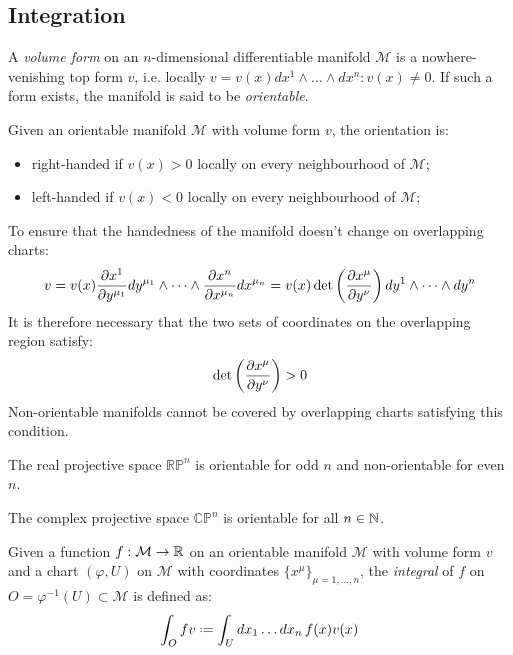 \subsection{Integration}

\begin{definition}
  A \textit{volume form} on an $ n $-dimensional differentiable manifold $ \mathcal{M} $ is a nowhere-venishing top form $ v $, i.e. locally $ v = v(x) dx^1 \wedge \dots \wedge dx^n : v(x) \neq 0 $. If such a form exists, the manifold is said to be \textit{orientable}.
\end{definition}

\begin{definition}
  Given an orientable manifold $ \mathcal{M} $ with volume form $ v $, the orientation is:
  \begin{itemize}
    \item right-handed if $ v(x) > 0 $ locally on every neighbourhood of $ \mathcal{M} $;
    \item left-handed if $ v(x) < 0 $ locally on every neighbourhood of $ \mathcal{M} $;
  \end{itemize}
\end{definition}

To ensure that the handedness of the manifold doesn't change on overlapping charts:
\begin{equation*}
  v = v(x) \frac{\partial x^1}{\partial y^{\mu_1}} dy^{\mu_1} \wedge \dots \wedge \frac{\partial x^n}{\partial x^{\mu_n}} dx^{\mu_n} = v(x) \det \left( \frac{\partial x^{\mu}}{\partial y^{\nu}} \right) dy^1 \wedge \dots \wedge dy^n
\end{equation*}
It is therefore necessary that the two sets of coordinates on the overlapping region satisfy:
\begin{equation}
  \det \left( \frac{\partial x^{\mu}}{\partial y^{\nu}} \right) > 0
  \label{eq:2.45}
\end{equation}
Non-orientable manifolds cannot be covered by overlapping charts satisfying this condition.

\begin{example}
  The real projective space $ \mathbb{RP}^n $ is orientable for odd $ n $ and non-orientable for even $ n $.
\end{example}
\begin{example}
  The complex projective space $ \mathbb{CP}^n $ is orientable for all $ n \in \mathbb{N} $.
\end{example}

\begin{definition}
  Given a function $ f : \mathcal{M} \rightarrow \mathbb{R} $ on an orientable manifold $ \mathcal{M} $ with volume form $ v $ and a chart $ (\varphi,U) $ on $ \mathcal{M} $ with coordinates $ \{x^{\mu}\}_{\mu = 1,\dots,n} $, the \textit{integral} of $ f $ on $ O = \varphi^{-1}(U) \subset \mathcal{M} $ is defined as:
  \begin{equation}
    \int_{O} fv \defeq \int_{U} dx_1 \dots dx_n \, f(x) v(x)
    \label{eq:2.46}
  \end{equation}
\end{definition}

